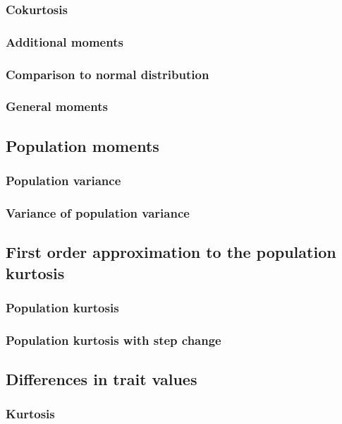\documentclass{article}
\begin{document}
\subsubsection{Cokurtosis}

\subsubsection{Additional moments}

\subsubsection{Comparison to normal distribution}

\subsubsection{General moments}

\subsection{Population moments}

\subsubsection{Population variance}

\subsubsection{Variance of population variance}

\subsection{First order approximation to the population kurtosis}

\subsubsection{Population kurtosis}

\subsubsection{Population kurtosis with step change}

\subsection{Differences in trait values}
\subsubsection{Kurtosis}

\end{document}
